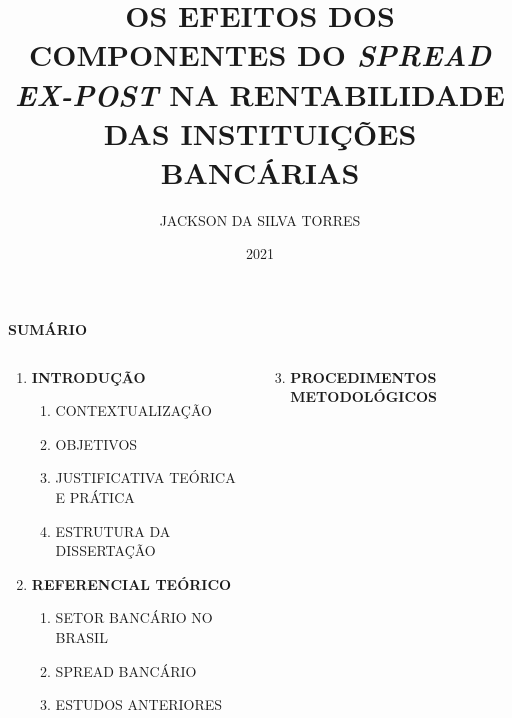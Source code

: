 \documentclass[ignorenonframetext,aspectratio=169,ignorenonframetext]{beamer}
\title{OS EFEITOS DOS COMPONENTES DO \emph{SPREAD} \emph{EX-POST} NA
RENTABILIDADE DAS INSTITUIÇÕES BANCÁRIAS}
\author{JACKSON DA SILVA TORRES}
\date{2021}
\providecommand{\tightlist}{%
  \setlength{\itemsep}{0pt}\setlength{\parskip}{0pt}}
\begin{document}
\frame{\titlepage}

\begin{frame}{\textbf{SUMÁRIO }}
\protect\hypertarget{sumuxe1rio}{}

\begin{columns}[T]
\begin{column}{0.6\textwidth}
\begin{enumerate}
\item
  \textbf{INTRODUÇÃO}

  \begin{enumerate}
  \item
    CONTEXTUALIZAÇÃO
  \item
    OBJETIVOS
  \item
    JUSTIFICATIVA TEÓRICA E PRÁTICA
  \item
    ESTRUTURA DA DISSERTAÇÃO
  \end{enumerate}
\item
  \textbf{REFERENCIAL TEÓRICO}

  \begin{enumerate}
  \item
    SETOR BANCÁRIO NO BRASIL
  \item
    SPREAD BANCÁRIO
  \item
    ESTUDOS ANTERIORES
  \end{enumerate}
\end{enumerate}
\end{column}

\begin{column}{0.4\textwidth}
\begin{enumerate}
\setcounter{enumi}{2}
\tightlist
\item
  \textbf{PROCEDIMENTOS METODOLÓGICOS}
\end{enumerate}
\end{column}
\end{columns}

\end{frame}
\end{document}
